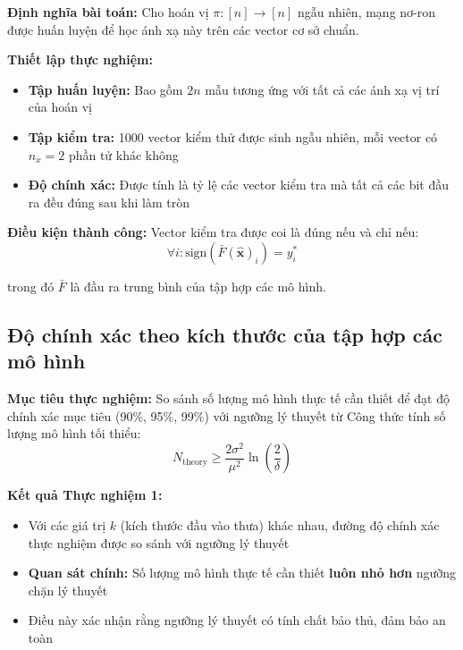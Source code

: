 \textbf{Định nghĩa bài toán:}
Cho hoán vị $\pi: [n] \rightarrow [n]$ ngẫu nhiên, mạng nơ-ron được huấn luyện để học ánh xạ này trên các vector cơ sở chuẩn.

\vspace{0.2cm}

\textbf{Thiết lập thực nghiệm:}
\begin{itemize}
    \item \textbf{Tập huấn luyện:} Bao gồm $2n$ mẫu tương ứng với tất cả các ánh xạ vị trí của hoán vị
    \item \textbf{Tập kiểm tra:} 1000 vector kiểm thử được sinh ngẫu nhiên, mỗi vector có $n_{\hat{x}} = 2$ phần tử khác không
    \item \textbf{Độ chính xác:} Được tính là tỷ lệ các vector kiểm tra mà tất cả các bit đầu ra đều đúng sau khi làm tròn
\end{itemize}

\textbf{Điều kiện thành công:}
Vector kiểm tra được coi là đúng nếu và chỉ nếu:
\begin{equation}
    \forall i: \text{sign}(\bar{F}(\hat{\mathbf{x}})_i) = y_i^*
\end{equation}

trong đó $\bar{F}$ là đầu ra trung bình của tập hợp các mô hình.

\subsection{Độ chính xác theo kích thước của tập hợp các mô hình}

\textbf{Mục tiêu thực nghiệm:}
So sánh số lượng mô hình thực tế cần thiết để đạt độ chính xác mục tiêu (90\%, 95\%, 99\%) với ngưỡng lý thuyết từ Công thức tính số lượng mô hình tối thiểu:
\begin{equation}
    N_{\text{theory}} \geq \frac{2\sigma^2}{\mu^2} \ln\left(\frac{2}{\delta}\right)
\end{equation}

\textbf{Kết quả Thực nghiệm 1:}
\begin{itemize}
    \item Với các giá trị $k$ (kích thước đầu vào thưa) khác nhau, đường độ chính xác thực nghiệm được so sánh với ngưỡng lý thuyết
    \item \textbf{Quan sát chính:} Số lượng mô hình thực tế cần thiết \textbf{luôn nhỏ hơn} ngưỡng chặn lý thuyết
    \item Điều này xác nhận rằng ngưỡng lý thuyết có tính chất bảo thủ, đảm bảo an toàn
\end{itemize}

